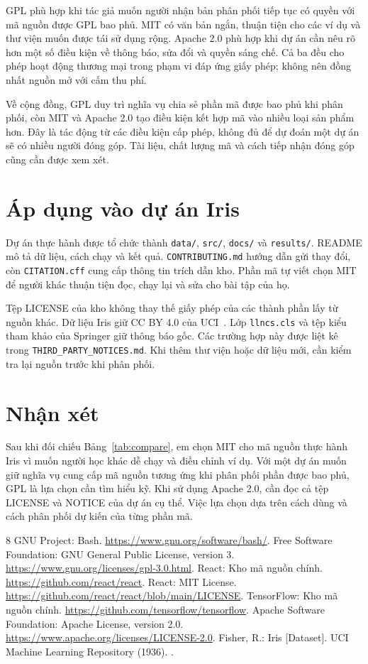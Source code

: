 \documentclass[runningheads]{llncs}
\begin{document}
GPL phù hợp khi tác giả muốn người nhận bản phân phối tiếp tục có quyền với mã nguồn được GPL bao phủ. MIT có văn bản ngắn, thuận tiện cho các ví dụ và thư viện muốn được tái sử dụng rộng. Apache 2.0 phù hợp khi dự án cần nêu rõ hơn một số điều kiện về thông báo, sửa đổi và quyền sáng chế. Cả ba đều cho phép hoạt động thương mại trong phạm vi đáp ứng giấy phép; không nên đồng nhất nguồn mở với cấm thu phí.

Về cộng đồng, GPL duy trì nghĩa vụ chia sẻ phần mã được bao phủ khi phân phối, còn MIT và Apache 2.0 tạo điều kiện kết hợp mã vào nhiều loại sản phẩm hơn. Đây là tác động từ các điều kiện cấp phép, không đủ để dự đoán một dự án sẽ có nhiều người đóng góp. Tài liệu, chất lượng mã và cách tiếp nhận đóng góp cũng cần được xem xét.

\section{Áp dụng vào dự án Iris}
Dự án thực hành được tổ chức thành \texttt{data/}, \texttt{src/}, \texttt{docs/} và \texttt{results/}. README mô tả dữ liệu, cách chạy và kết quả. \texttt{CONTRIBUTING.md} hướng dẫn gửi thay đổi, còn \texttt{CITATION.cff} cung cấp thông tin trích dẫn kho. Phần mã tự viết chọn MIT để người khác thuận tiện đọc, chạy lại và sửa cho bài tập của họ.

Tệp LICENSE của kho không thay thế giấy phép của các thành phần lấy từ nguồn khác. Dữ liệu Iris giữ CC BY 4.0 của UCI~\cite{iris}. Lớp \texttt{llncs.cls} và tệp kiểu tham khảo của Springer giữ thông báo gốc. Các trường hợp này được liệt kê trong \texttt{THIRD\_PARTY\_NOTICES.md}. Khi thêm thư viện hoặc dữ liệu mới, cần kiểm tra lại nguồn trước khi phân phối.

\section{Nhận xét}
Sau khi đối chiếu Bảng~\ref{tab:compare}, em chọn MIT cho mã nguồn thực hành Iris vì muốn người học khác dễ chạy và điều chỉnh ví dụ. Với một dự án muốn giữ nghĩa vụ cung cấp mã nguồn tương ứng khi phân phối phần được bao phủ, GPL là lựa chọn cần tìm hiểu kỹ. Khi sử dụng Apache 2.0, cần đọc cả tệp LICENSE và NOTICE của dự án cụ thể. Việc lựa chọn dựa trên cách dùng và cách phân phối dự kiến của từng phần mã.

\begin{thebibliography}{8}
 GNU Project: Bash. \url{https://www.gnu.org/software/bash/}.
 Free Software Foundation: GNU General Public License, version 3. \url{https://www.gnu.org/licenses/gpl-3.0.html}.
 React: Kho mã nguồn chính. \url{https://github.com/react/react}.
 React: MIT License. \url{https://github.com/react/react/blob/main/LICENSE}.
 TensorFlow: Kho mã nguồn chính. \url{https://github.com/tensorflow/tensorflow}.
 Apache Software Foundation: Apache License, version 2.0. \url{https://www.apache.org/licenses/LICENSE-2.0}.
 Fisher, R.: Iris [Dataset]. UCI Machine Learning Repository (1936). .
\end{thebibliography}
\end{document}

